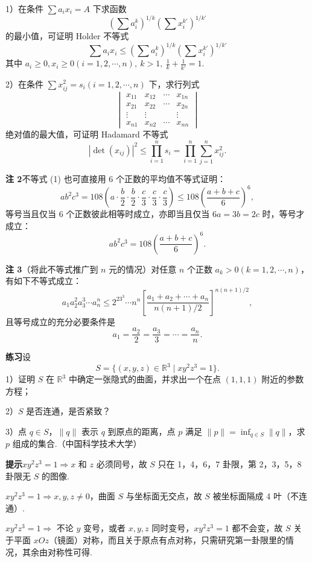 \documentclass[UTF8, 12pt, fontset=fandol, oneside]{ctexart}
\begin{document}
1）在条件 $\sum a_ix_i=A$ 下求函数
\[
  \left(\sum a_i^k\right)^{1/k}\left(\sum x_i^{k'}\right)^{1/k'}
\]
的最小值，可证明 Holder 不等式
\[
  \sum a_ix_i\le
  \left(\sum a_i^k\right)^{1/k}
  \left(\sum x_i^{k'}\right)^{1/k'}
\]
其中 $a_i\ge0,x_i\ge0(i=1,2,\cdots,n),\ k>1,\ \frac1k+\frac1{k'}=1$.

2）在条件 $\sum x_{ij}^2=s_i(i=1,2,\cdots,n)$ 下，求行列式
\[
  \begin{vmatrix}
    x_{11}&x_{12}&\cdots&x_{1n}\\
    x_{21}&x_{22}&\cdots&x_{2n}\\
    \vdots&\vdots&&\vdots\\
    x_{n1}&x_{n2}&\cdots&x_{nn}
  \end{vmatrix}
\]
绝对值的最大值，可证明 Hadamard 不等式
\[
  |\det(x_{ij})|^2\le
  \prod_{i=1}^{n}s_i=
  \prod_{i=1}^{n}\sum_{j=1}^{n}x_{ij}^2.
\]

\noindent\textbf{注 2}\quad 不等式 (1) 也可直接用 6 个正数的平均值不等式证明：
\[
  ab^2c^3=108\left(a\cdot\frac b2\cdot\frac b2\cdot
  \frac c3\cdot\frac c3\cdot\frac c3\right)
  \le108\left(\frac{a+b+c}{6}\right)^6,
\]
等号当且仅当 6 个正数彼此相等时成立，亦即当且仅当 $6a=3b=2c$ 时，等号才成立：
\[
  ab^2c^3=108\left(\frac{a+b+c}{6}\right)^6.
\]

\noindent\textbf{注 3}\quad （将此不等式推广到 $n$ 元的情况）对任意 $n$ 个正数 $a_k>0(k=1,2,\cdots,n)$，有如下不等式成立：
\[
  a_1a_2^2a_3^3\cdots a_n^n
  \le2^23^3\cdots n^n
  \left[\frac{a_1+a_2+\cdots+a_n}{n(n+1)/2}\right]^{n(n+1)/2},
\]
且等号成立的充分必要条件是
\[
  a_1=\frac{a_2}{2}=\frac{a_3}{3}=\cdots=\frac{a_n}{n}.
\]

\noindent\textbf{练习}\quad 设
\[
  S=\{(x,y,z)\in\mathbb{R}^3\mid xy^2z^3=1\}.
\]
1）证明 $S$ 在 $\mathbb{R}^3$ 中确定一张隐式的曲面，并求出一个在点 $(1,1,1)$ 附近的参数方程；

2）$S$ 是否连通，是否紧致？

3）点 $q\in S$，$\|q\|$ 表示 $q$ 到原点的距离，点 $p$ 满足 $\|p\|=\inf_{q\in S}\|q\|$，求 $p$ 组成的集合.（中国科学技术大学）

\noindent\textbf{提示}\quad $xy^2z^3=1\Rightarrow x$ 和 $z$ 必须同号，故 $S$ 只在 1，4，6，7 卦限，第 2，3，5，8 卦限无 $S$ 的图像.

$xy^2z^3=1\Rightarrow x,y,z\ne0$，曲面 $S$ 与坐标面无交点，故 $S$ 被坐标面隔成 4 叶（不连通）.

$xy^2z^3=1\Rightarrow$ 不论 $y$ 变号，或者 $x,y,z$ 同时变号，$xy^2z^3=1$ 都不会变，故 $S$ 关于平面 $xOz$（镜面）对称，而且关于原点有点对称，只需研究第一卦限里的情况，其余由对称性可得.
\end{document}
